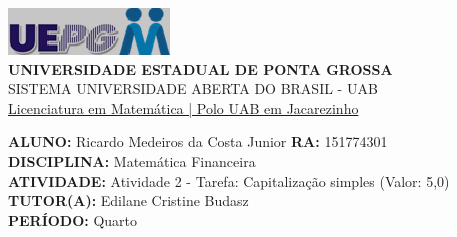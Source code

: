 \documentclass[a4paper, 12pt]{article}
\begin{document}
\begin{flushleft}\includegraphics{logo}\\
\textbf{UNIVERSIDADE ESTADUAL DE PONTA GROSSA} \\
SISTEMA UNIVERSIDADE ABERTA DO BRASIL - UAB \\
\underline{Licenciatura em Matemática | Polo UAB em Jacarezinho}\end{flushleft} 
\textbf{ALUNO:} Ricardo Medeiros da Costa Junior   \textbf{RA:} 151774301 \\
\textbf{DISCIPLINA:} Matemática Financeira \\
\textbf{ATIVIDADE:} Atividade 2 - Tarefa: Capitalização simples (Valor: 5,0) \\ 
\textbf{TUTOR(A):} Edilane Cristine Budasz \\
\textbf{PERÍODO:} Quarto \\
\end{document}
